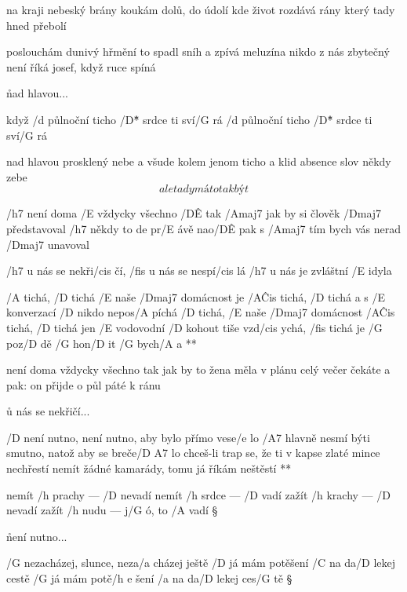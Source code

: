 na kraji nebeský brány
koukám dolů, do údolí
kde život rozdává rány
který tady hned přebolí \s

poslouchám dunivý hřmění
to spadl sníh a zpívá meluzína
nikdo z nás zbytečný není
říká josef, když ruce spíná

\r nad hlavou...

když /d půlnoční ticho /D\^{*} srdce ti sví/G rá
/d půlnoční ticho /D\^{*} srdce ti sví/G rá

\rr

nad hlavou prosklený nebe
a všude kolem jenom ticho a klid
absence slov někdy zebe
\[ ale tady má to tak být \]




/h7 není doma /E vždycky všechno /D\^E tak
/Amaj7 jak by si člověk /Dmaj7 představoval
/h7 někdy to de pr/E ávě nao/D\^E pak
s /Amaj7 tím bych vás nerad /Dmaj7 unavoval

\R  /h7 u nás se nekři/cis čí, /fis u nás se nespí/cis lá
    /h7 u nás je zvláštní /E idyla

    /A tichá, /D tichá /E naše /Dmaj7 domácnost je /A\^{Cis} tichá, /D tichá
    a s /E konverzací /D nikdo nepos/A píchá
    /D tichá, /E naše /Dmaj7 domácnost /A\^{Cis} tichá, /D tichá
    jen /E vodovodní /D kohout tiše vzd/cis ychá, /fis tichá
    je /G poz/D dě /G hon/D it /G bych/A a **

není doma vždycky všechno tak
jak by to žena měla v plánu
celý večer čekáte a pak:
on přijde o půl páté k ránu

\r u nás se nekřičí...




\R  /D není nutno, není nutno, aby bylo přímo vese/e lo
    /A7 hlavně nesmí býti smutno, natož aby se breče/{D A7} lo \s
    chceš-li trap se, že ti v kapse zlaté mince nechřestí
    nemít žádné kamarády, tomu já říkám neštěstí **

nemít /h prachy --- /D nevadí
nemít /h srdce --- /D vadí
zažít /h krachy --- /D nevadí
zažít /h nudu --- j/G ó, to /A vadí \S

\r není nutno...




/G nezacházej, slunce, neza/a cházej ještě
/D já mám potěšení /C na da/D lekej cestě
/G já mám potě/{h e} šení    /a na da/D lekej ces/G tě \S

